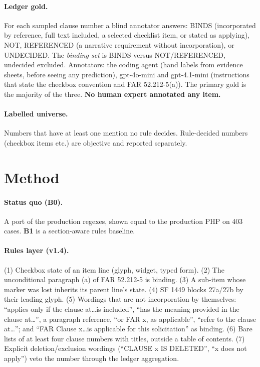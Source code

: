 \documentclass[11pt]{article}
\begin{document}
\paragraph{Ledger gold.} For each sampled clause number a blind annotator answers: BINDS (incorporated by reference, full text included, a selected checklist item, or stated as applying), NOT, REFERENCED (a narrative requirement without incorporation), or UNDECIDED. The \emph{binding set} is BINDS versus NOT/REFERENCED, undecided excluded. Annotators: the coding agent (hand labels from evidence sheets, before seeing any prediction), gpt-4o-mini and gpt-4.1-mini (instructions that state the checkbox convention and FAR 52.212-5(a)). The primary gold is the majority of the three. \textbf{No human expert annotated any item.}
\paragraph{Labelled universe.} Numbers that have at least one mention no rule decides. Rule-decided numbers (checkbox items etc.) are objective and reported separately.

\section{Method}
\paragraph{Status quo (B0).} A port of the production regexes, shown equal to the production PHP on 403 cases. \textbf{B1} is a section-aware rules baseline.
\paragraph{Rules layer (v1.4).} (1) Checkbox state of an item line (glyph, widget, typed form). (2) The unconditional paragraph (a) of FAR 52.212-5 is binding. (3) A sub-item whose marker was lost inherits its parent line's state. (4) SF 1449 blocks 27a/27b by their leading glyph. (5) Wordings that are not incorporation by themselves: ``applies only if the clause at\ldots is included'', ``has the meaning provided in the clause at\ldots'', a paragraph reference, ``or FAR x, as applicable'', ``refer to the clause at\ldots''; and ``FAR Clause x\ldots is applicable for this solicitation'' as binding. (6) Bare lists of at least four clause numbers with titles, outside a table of contents. (7) Explicit deletion/exclusion wordings (``CLAUSE x IS DELETED'', ``x does not apply'') veto the number through the ledger aggregation.
\end{document}
